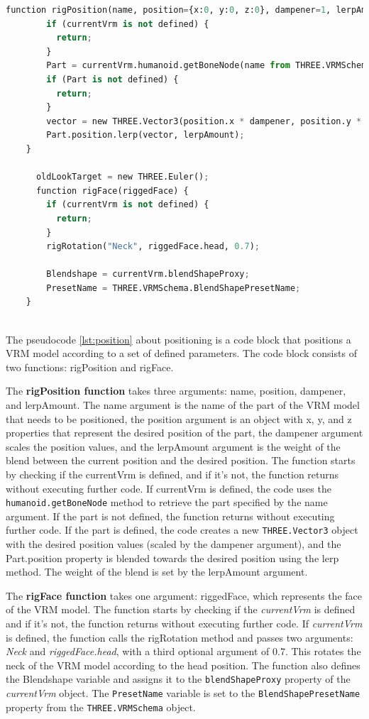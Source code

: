 \begin{lstlisting}[language=Python,caption=Position of the model,label=lst:position]
    function rigPosition(name, position={x:0, y:0, z:0}, dampener=1, lerpAmount=0.3) {
        if (currentVrm is not defined) {
          return;
        }
        Part = currentVrm.humanoid.getBoneNode(name from THREE.VRMSchema.HumanoidBoneName);
        if (Part is not defined) {
          return;
        }
        vector = new THREE.Vector3(position.x * dampener, position.y * dampener, position.z * dampener);
        Part.position.lerp(vector, lerpAmount);
    }
      
      oldLookTarget = new THREE.Euler();
      function rigFace(riggedFace) {
        if (currentVrm is not defined) {
          return;
        }
        rigRotation("Neck", riggedFace.head, 0.7);
      
        Blendshape = currentVrm.blendShapeProxy;
        PresetName = THREE.VRMSchema.BlendShapePresetName;
    }
      

\end{lstlisting}
The pseudocode \ref{lst:position} about positioning is a code block that positions a VRM model according to a set of defined parameters. 
The code block consists of two functions: rigPosition and rigFace.

The \textbf{rigPosition function} takes three arguments: name, position, dampener, and lerpAmount. The name argument is the name 
of the part of the VRM model that needs to be positioned, the position argument is an object with x, y, and z properties 
that represent the desired position of the part, the dampener argument scales the position values, and the lerpAmount 
argument is the weight of the blend between the current position and the desired position.
The function starts by checking if the currentVrm is defined, and if it's not, the function returns without executing further code. 
If currentVrm is defined, the code uses the \texttt{humanoid.getBoneNode} method to retrieve the part specified by the name argument. 
If the part is not defined, the function returns without executing further code.
If the part is defined, the code creates a new \texttt{THREE.Vector3} object with the desired position 
values (scaled by the dampener argument), and the Part.position property is blended towards the 
desired position using the lerp method. The weight of the blend is set by the lerpAmount argument.

The \textbf{rigFace function} takes one argument: riggedFace, which represents the face of the VRM model. The function starts 
by checking if the \emph{currentVrm} is defined and if it's not, the function returns without executing further code.
If \emph{currentVrm} is defined, the function calls the rigRotation method and passes two arguments: \emph{Neck} and \emph{riggedFace.head}, 
with a third optional argument of 0.7. This rotates the neck of the VRM model according to the head position.
The function also defines the Blendshape variable and assigns it to the \texttt{blendShapeProxy} property of the \emph{currentVrm} object. 
The \texttt{PresetName} variable is set to the \texttt{BlendShapePresetName} property from the \texttt{THREE.VRMSchema} object.

